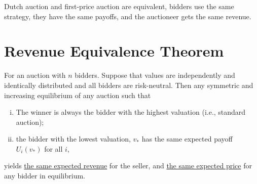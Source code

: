 \documentclass{article}
\begin{document}
	\begin{remark}
		Dutch auction and first-price auction are equivalent, bidders use the same strategy, they have the same payoffs, and the auctioneer gets the same revenue.
	\end{remark}
	
	\section{Revenue Equivalence Theorem}
	\begin{theorem}
		For an auction with $n$ bidders. Suppose that values are independently and identically distributed and all bidders are risk-neutral. Then any symmetric and increasing equilibrium of any auction such that
		\begin{enumerate}[(i)]
			\item The winner is always the bidder with the highest valuation (i.e., standard auction);
			\item the bidder with the lowest valuation, $v_*$ has the same expected payoff $U_i(v_*)$ for all $i$,
		\end{enumerate}
		yields \ul{the same expected revenue} for the seller, and \ul{the same expected price} for any bidder in equilibrium.
	\end{theorem}
	
\end{document}
